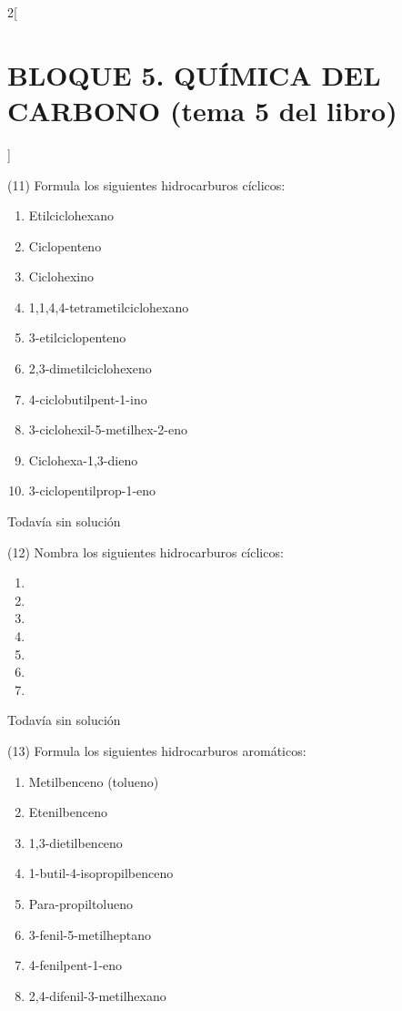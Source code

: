 \documentclass[10pt]{article}
\begin{document}
\begin{multicols}{2}[
  \section{BLOQUE 5. QUÍMICA DEL CARBONO (tema 5 del libro)}
  ]
\begin{exercise}
  (11) Formula los siguientes hidrocarburos cíclicos:
  \begin{enumerate}
    \item Etilciclohexano
    \item Ciclopenteno
    \item Ciclohexino
    \item 1,1,4,4-tetrametilciclohexano
    \item 3-etilciclopenteno
    \item 2,3-dimetilciclohexeno
    \item 4-ciclobutilpent-1-ino
    \item 3-ciclohexil-5-metilhex-2-eno
    \item Ciclohexa-1,3-dieno
    \item 3-ciclopentilprop-1-eno
  \end{enumerate}
\end{exercise}

\begin{solution}[print=false]
  Todavía sin solución
\end{solution}

\begin{exercise}
  (12) Nombra los siguientes hidrocarburos cíclicos:
  \begin{enumerate}
    \item {}
    \item {}
    \item {}
    \item {}
    \item {}
    \item {}
    \item {}
  \end{enumerate}
\end{exercise}

\begin{solution}[print=false]
  Todavía sin solución
\end{solution}

\begin{exercise}
  (13) Formula los siguientes hidrocarburos aromáticos:
  \begin{enumerate}
    \item Metilbenceno (tolueno)
    \item Etenilbenceno
    \item 1,3-dietilbenceno
    \item 1-butil-4-isopropilbenceno
    \item Para-propiltolueno
    \item 3-fenil-5-metilheptano
    \item 4-fenilpent-1-eno
    \item 2,4-difenil-3-metilhexano
  \end{enumerate}
\end{exercise}


\end{multicols}
\end{document}
